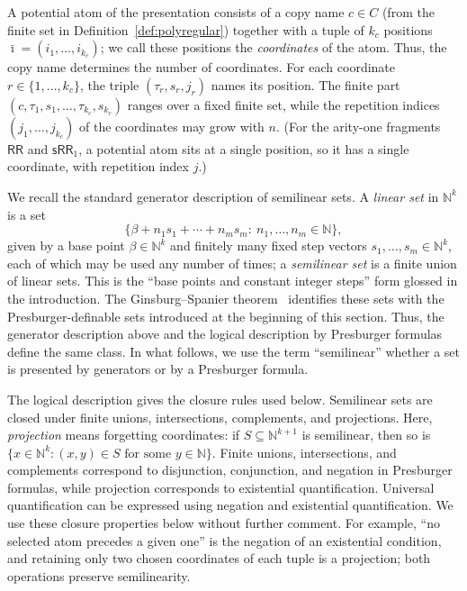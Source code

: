 \documentclass[11pt]{article}
\theoremstyle{definition}
\newcommand{\N}{\mathbb N}
\newcommand{\RR}{\mathsf{RR}}
\newcommand{\SWR}{\mathsf{sRR}_1}
\begin{document}
A potential atom of the presentation consists of a copy name $c\in C$ (from
the finite set in Definition~\ref{def:polyregular}) together with a tuple of
$k_c$ positions $\bar\imath=(i_1,\ldots,i_{k_c})$; we call these positions the
\emph{coordinates} of the atom.  Thus, the copy name determines the number of
coordinates.  For each coordinate $r\in\{1,\ldots,k_c\}$, the triple
$(\tau_r,s_r,j_r)$ names its position.  The finite part
$(c,\tau_1,s_1,\ldots,\tau_{k_c},s_{k_c})$ ranges over a fixed finite set,
while the repetition indices
$(j_1,\ldots,j_{k_c})$ of the coordinates may grow with $n$.  (For the arity-one
fragments $\RR$ and $\SWR$, a potential atom sits at a single position, so it
has a single coordinate, with repetition index $j$.)

We recall the standard generator description of semilinear sets.  A
\emph{linear set} in $\N^k$ is a set
\[
   \{\beta+n_1 s_1+\cdots+n_m s_m:\ n_1,\ldots,n_m\in\N\},
\]
given by a base point $\beta\in\N^k$ and finitely many fixed step vectors
$s_1,\ldots,s_m\in\N^k$, each of which may be used any number of times; a
\emph{semilinear set} is a finite union of linear sets.  This is the ``base
points and constant integer steps'' form glossed in the introduction.
The Ginsburg--Spanier theorem~\cite{GinsburgSpanier1966} identifies these sets
with the Presburger-definable sets introduced at the beginning of this section.
Thus, the generator description above and the logical description by Presburger
formulas define the same class.  In what follows, we use the term
``semilinear'' whether a set is presented by generators or by a Presburger
formula.

The logical description gives the closure rules used below.  Semilinear sets
are closed under finite unions, intersections, complements, and projections.
Here, \emph{projection} means forgetting coordinates: if
$S\subseteq\N^{k+1}$ is semilinear, then so is
$\{x\in\N^k:(x,y)\in S\text{ for some }y\in\N\}$.
Finite unions, intersections, and complements correspond to disjunction,
conjunction, and negation in Presburger formulas, while projection corresponds
to existential quantification.  Universal quantification can be expressed
using negation and existential quantification.  We use these closure properties
below without further comment.  For example, ``no selected atom precedes a
given one'' is the negation of an existential condition, and retaining only two
chosen coordinates of each tuple is a projection; both operations preserve
semilinearity.
\end{document}
